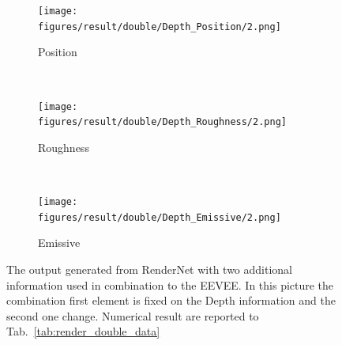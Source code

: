 \begin{figure}[h!]
    \begin{subfigure}[b]{0.175\textwidth}
     \texttt{[image: figures/result/double/Depth\_Position/2.png]}
     \caption{Position}
    \end{subfigure}
    ~
    \begin{subfigure}[b]{0.175\textwidth}
     \texttt{[image: figures/result/double/Depth\_Roughness/2.png]}
     \caption{Roughness}
    \end{subfigure}
    ~
    \begin{subfigure}[b]{0.175\textwidth}
     \texttt{[image: figures/result/double/Depth\_Emissive/2.png]}
     \caption{Emissive}
     \label{subfig:double_input_base_depth_and_emissive2}
    \end{subfigure}
    \caption{The output generated from RenderNet with two additional information used in combination to the EEVEE. In this picture the combination first element is fixed on the Depth information and the second one change. Numerical result are reported to Tab.~\ref{tab:render_double_data}}
    \label{fig:double_input_base_depth_generation}
\end{figure}

